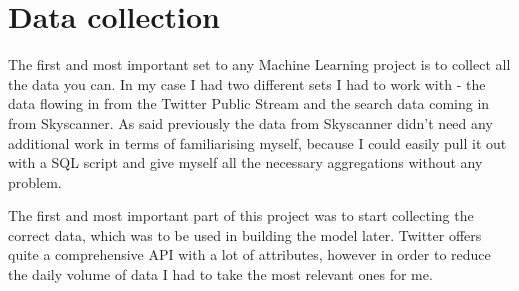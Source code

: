 \documentclass[minf,frontabs,twoside,singlespacing,parskip]{infthesis}
\begin{document}

\section{Data collection}
\label{sec:dc}


The first and most important set to any Machine Learning project is to collect all the data you can. In my case I had two different sets I had to work with - the data flowing in from the Twitter Public Stream and the search data coming in from Skyscanner. As said previously the data from Skyscanner didn't need any additional work in terms of familiarising myself, because I could easily pull it out with a SQL script and give myself all the necessary aggregations without any problem. 

The first and most important part of this project was to start collecting the correct data, which was to be used in building the model later. Twitter offers quite a comprehensive API with a lot of attributes, however in order to reduce the daily volume of data I had to take the most relevant ones for me. 
\end{document}
